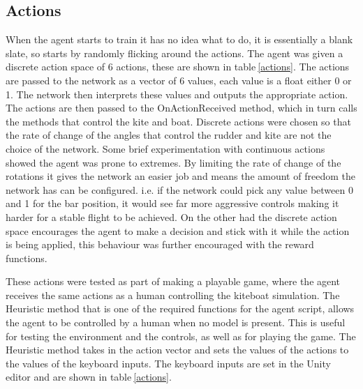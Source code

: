 \subsection{Actions}
When the agent starts to train it has no idea what to do, it is essentially a blank slate, so starts by randomly flicking around the actions. The agent was given a discrete action space of 6 actions, these are shown in table$~$\ref{actions}. The actions are passed to the network as a vector of 6 values, each value is a float either 0 or 1. The network then interprets these values and outputs the appropriate action. The actions are then passed to the OnActionReceived method, which in turn calls the methods that control the kite and boat. Discrete actions were chosen so that the rate of change of the angles that control the rudder and kite are not the choice of the network. Some brief experimentation with continuous actions showed the agent was prone to extremes. By limiting the rate of change of the rotations it gives the network an easier job and means the amount of freedom the network has can be configured. i.e. if the network could pick any value between 0 and 1 for the bar position, it would see far more aggressive controls making it harder for a stable flight to be achieved. On the other had the discrete action space encourages the agent to make a decision and stick with it while the action is being applied, this behaviour was further encouraged with the reward functions. 

These actions were tested as part of making a playable game, where the agent receives the same actions as a human controlling the kiteboat simulation. The Heuristic method that is one of the required functions for the agent script, allows the agent to be controlled by a human when no model is present. This is useful for testing the environment and the controls, as well as for playing the game. The Heuristic method takes in the action vector and sets the values of the actions to the values of the keyboard inputs. The keyboard inputs are set in the Unity editor and are shown in table$~$\ref{actions}. 

\begin{table}[h]
    \centering
    \caption{Actions}\label{actions}
\end{table}


